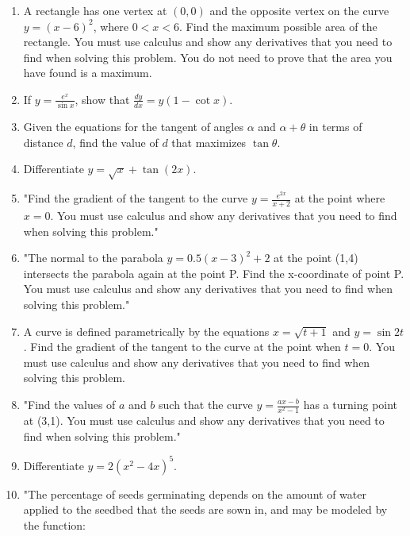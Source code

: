 \documentclass{article}
\begin{document}
\begin{enumerate}
\vspace{3cm}
\item A rectangle has one vertex at \((0,0)\) and the opposite vertex on the curve \(y = (x - 6)^2\), where \(0 < x < 6\). Find the maximum possible area of the rectangle. You must use calculus and show any derivatives that you need to find when solving this problem. You do not need to prove that the area you have found is a maximum.
\vspace{3cm}
\item If \( y = \frac{e^x}{\sin x} \), show that \(\frac{dy}{dx} = y(1 - \cot x)\).
\vspace{3cm}
\item Given the equations for the tangent of angles \(\alpha\) and \(\alpha + \theta\) in terms of distance \(d\), find the value of \(d\) that maximizes \(\tan \theta\).
\vspace{3cm}
\item Differentiate \( y = \sqrt{x} + \tan(2x) \).
\vspace{3cm}
\item "Find the gradient of the tangent to the curve \( y = \frac{e^{2x}}{x+2} \) at the point where \( x = 0 \). You must use calculus and show any derivatives that you need to find when solving this problem."
\vspace{3cm}
\item "The normal to the parabola \( y = 0.5(x - 3)^2 + 2 \) at the point (1,4) intersects the parabola again at the point P. Find the x-coordinate of point P. You must use calculus and show any derivatives that you need to find when solving this problem."
\vspace{3cm}
\item A curve is defined parametrically by the equations \( x = \sqrt{t+1} \) and \( y = \sin 2t \). Find the gradient of the tangent to the curve at the point when \( t = 0 \). You must use calculus and show any derivatives that you need to find when solving this problem.
\vspace{3cm}
\item "Find the values of \( a \) and \( b \) such that the curve \( y = \frac{ax - b}{x^2 - 1} \) has a turning point at (3,1). You must use calculus and show any derivatives that you need to find when solving this problem."
\vspace{3cm}
\item Differentiate \( y = 2(x^2 - 4x)^5 \).
\vspace{3cm}
\item "The percentage of seeds germinating depends on the amount of water applied to the seedbed that the seeds are sown in, and may be modeled by the function:


\end{enumerate}
\end{document}
